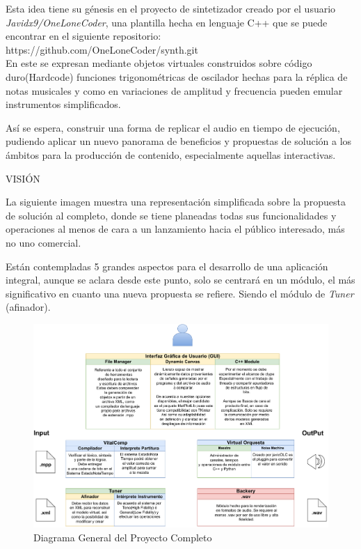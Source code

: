 \documentclass{book}
\begin{document}
	Esta idea tiene su génesis en el proyecto de sintetizador creado por el usuario \emph{Javidx9/OneLoneCoder}, una plantilla hecha en lenguaje C++ que se puede encontrar en el siguiente repositorio: \color{blue}https://github.com/OneLoneCoder/synth.git \color{black}\\En este se expresan mediante objetos virtuales construidos sobre código duro(Hardcode) funciones trigonométricas de oscilador hechas para la réplica de notas musicales y como en variaciones de amplitud y frecuencia pueden emular instrumentos simplificados.\par
	Así se espera, construir una forma de replicar el audio en tiempo de ejecución, pudiendo aplicar un nuevo panorama de beneficios y propuestas de solución a los ámbitos para la producción de contenido, especialmente aquellas interactivas.\par
	\pagebreak
	\begin{minipage}{.7\textwidth}
		\begin{flushleft}
			\vspace{10pt}
			\begin{center}
				\Large{VISIÓN}
				\hrulefill\\[1.5cm]
			\end{center}
		\end{flushleft}
	\end{minipage}\par
	La siguiente imagen muestra una representación simplificada sobre la propuesta de solución al completo, donde se tiene planeadas todas sus funcionalidades y operaciones al menos de cara a un lanzamiento hacia el público interesado, más no uno comercial.\par
	
	Están contempladas 5 grandes aspectos para el desarrollo de una aplicación integral, aunque se aclara desde este punto, solo se centrará en un módulo, el más significativo en cuanto una nueva propuesta se refiere. Siendo el módulo de \emph{Tuner} (afinador).
	\begin{figure}[h]
		\includegraphics[width=1.25\linewidth]{Assets/images/musiC++_Diagram}
		\caption{ Diagrama General del Proyecto Completo}
	\end{figure} 
	
\end{document}
